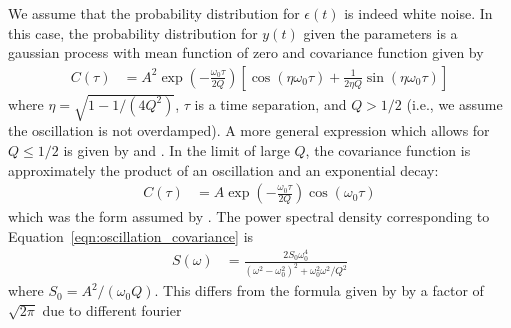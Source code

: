 \documentclass[a4paper, 12pt]{article}
\begin{document}
We assume that the probability distribution for $\epsilon(t)$ is indeed white
noise. In this case, the probability distribution for $y(t)$ given the
parameters is a gaussian process with mean function of zero and
covariance function given by
\begin{align}
C(\tau) &= A^2\exp\left(-\frac{\omega_0\tau}{2Q}\right)
            \left[\cos(\eta\omega_0\tau)
                + \frac{1}{2\eta Q}\sin(\eta\omega_0\tau)\right]
    \label{eqn:oscillation_covariance}
\end{align}
where $\eta = \sqrt{1 - 1/(4Q^2)}$, $\tau$ is a time separation,
and $Q > 1/2$ (i.e., we assume the oscillation is not overdamped).
A more general expression which allows for $Q \leq 1/2$
is given by \citet{anderson} and \citet{celerite}.
In the limit of large $Q$, the covariance function is approximately
the product of an oscillation and an exponential decay:
\begin{align}
C(\tau) &= A\exp\left(-\frac{\omega_0\tau}{2Q}\right)\cos(\omega_0\tau)
\end{align}
which was the form assumed by \citet{brewer_stello}.
The power spectral density corresponding to
Equation~\ref{eqn:oscillation_covariance} is
\begin{align}
S(\omega) &= \frac{2S_0\omega_0^4}
                  {(\omega^2 - \omega_0^2)^2 + \omega_0^2\omega^2/Q^2}
\end{align}
where $S_0 = A^2/(\omega_0Q)$. This differs from the formula given by
\citet{celerite} by a factor of $\sqrt{2\pi}$ due to different fourier
\end{document}
